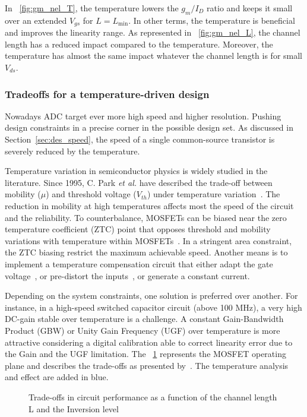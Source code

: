 In \figurename~\ref{fig:gm_nel_T}, the temperature lowers the \(g_m/I_D\) ratio and keeps it small over an extended \(V_{gs}\) for \(L = L_{\min}\). In other terms, the temperature is beneficial and improves the linearity range. As represented in \figurename~\ref{fig:gm_nel_L}, the channel length has a reduced impact compared to the temperature. Moreover, the temperature has almost the same impact whatever the channel length is for small \(V_{ds}\).

\subsubsection{Tradeoffs for a temperature-driven design}
Nowadays ADC target ever more high speed and higher resolution. Pushing design constraints in a precise corner in the possible design set. As discussed in Section~\ref{sec:des_speed}, the speed of a single common-source transistor is severely reduced by the temperature. 

Temperature variation in semiconductor physics is widely studied in the literature. Since 1995, C. Park \textit{et al.} have described the trade-off between mobility (\(\mu \)) and threshold voltage (\(V_{th} \)) under temperature variation~\cite{Park1995}. The reduction in mobility at high temperatures affects most the speed of the circuit and the reliability. To counterbalance, MOSFETs can be biased near the zero temperature coefficient (ZTC) point that opposes threshold and mobility variations with temperature within MOSFETs~\cite{Shoucair1986,Filanovsky2001}. In a stringent area constraint, the ZTC biasing restrict the maximum achievable speed. Another means is to implement a temperature compensation circuit that either adapt the gate voltage~\cite{Chen2011, Gomez2010}, or pre-distort the inputs~\cite{Sira2013}, or generate a constant current.

Depending on the system constraints, one solution is preferred over another. For instance, in a high-speed switched capacitor circuit (above 100 MHz), a very high DC-gain stable over temperature is a challenge. A constant Gain-Bandwidth Product (GBW) or Unity Gain Frequency (UGF) over temperature is more attractive considering a digital calibration able to correct linearity error due to the Gain and the UGF limitation. The \figurename~\ref{fig:tradeoffs} represents the MOSFET operating plane and describes the trade-offs as presented by~\cite{Binkley2003}. The temperature analysis and effect are added in blue.
\begin{figure}[!ht]
	\centering
	
	\caption{Trade-offs in circuit performance as a function of the channel length L and the Inversion level}
	\label{fig:tradeoffs}
\end{figure}

